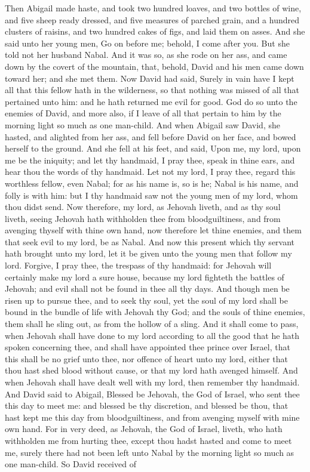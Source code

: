 Then Abigail made haste, and took two hundred loaves, and two bottles of wine, and five sheep ready dressed, and five measures of parched grain, and a hundred clusters of raisins, and two hundred cakes of figs, and laid them on asses. And she said unto her young men, Go on before me; behold, I come after you. But she told not her husband Nabal. And it was so, as she rode on her ass, and came down by the covert of the mountain, that, behold, David and his men came down toward her; and she met them. Now David had said, Surely in vain have I kept all that this fellow hath in the wilderness, so that nothing was missed of all that pertained unto him: and he hath returned me evil for good. God do so unto the enemies of David, and more also, if I leave of all that pertain to him by the morning light so much as one man-child.  And when Abigail saw David, she hasted, and alighted from her ass, and fell before David on her face, and bowed herself to the ground. And she fell at his feet, and said, Upon me, my lord, upon me be the iniquity; and let thy handmaid, I pray thee, speak in thine ears, and hear thou the words of thy handmaid. Let not my lord, I pray thee, regard this worthless fellow, even Nabal; for as his name is, so is he; Nabal is his name, and folly is with him: but I thy handmaid saw not the young men of my lord, whom thou didst send. Now therefore, my lord, as Jehovah liveth, and as thy soul liveth, seeing Jehovah hath withholden thee from bloodguiltiness, and from avenging thyself with thine own hand, now therefore let thine enemies, and them that seek evil to my lord, be as Nabal. And now this present which thy servant hath brought unto my lord, let it be given unto the young men that follow my lord. Forgive, I pray thee, the trespass of thy handmaid: for Jehovah will certainly make my lord a sure house, because my lord fighteth the battles of Jehovah; and evil shall not be found in thee all thy days. And though men be risen up to pursue thee, and to seek thy soul, yet the soul of my lord shall be bound in the bundle of life with Jehovah thy God; and the souls of thine enemies, them shall he sling out, as from the hollow of a sling. And it shall come to pass, when Jehovah shall have done to my lord according to all the good that he hath spoken concerning thee, and shall have appointed thee prince over Israel, that this shall be no grief unto thee, nor offence of heart unto my lord, either that thou hast shed blood without cause, or that my lord hath avenged himself. And when Jehovah shall have dealt well with my lord, then remember thy handmaid.  And David said to Abigail, Blessed be Jehovah, the God of Israel, who sent thee this day to meet me: and blessed be thy discretion, and blessed be thou, that hast kept me this day from bloodguiltiness, and from avenging myself with mine own hand. For in very deed, as Jehovah, the God of Israel, liveth, who hath withholden me from hurting thee, except thou hadst hasted and come to meet me, surely there had not been left unto Nabal by the morning light so much as one man-child. So David received of 